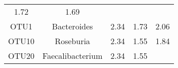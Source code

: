 \documentclass[12pt,]{article}
\begin{document}
\begin{longtable}[]{@{}ccccc@{}}
\begin{minipage}[t]{0.25\columnwidth}
1.72\strut
\end{minipage} & \begin{minipage}[t]{0.19\columnwidth}\centering\strut
1.69\strut
\end{minipage}\tabularnewline
\begin{minipage}[t]{0.07\columnwidth}\centering\strut
OTU1\strut
\end{minipage} & \begin{minipage}[t]{0.18\columnwidth}\centering\strut
Bacteroides\strut
\end{minipage} & \begin{minipage}[t]{0.17\columnwidth}\centering\strut
2.34\strut
\end{minipage} & \begin{minipage}[t]{0.25\columnwidth}\centering\strut
1.73\strut
\end{minipage} & \begin{minipage}[t]{0.19\columnwidth}\centering\strut
2.06\strut
\end{minipage}\tabularnewline
\begin{minipage}[t]{0.07\columnwidth}\centering\strut
OTU10\strut
\end{minipage} & \begin{minipage}[t]{0.18\columnwidth}\centering\strut
Roseburia\strut
\end{minipage} & \begin{minipage}[t]{0.17\columnwidth}\centering\strut
2.34\strut
\end{minipage} & \begin{minipage}[t]{0.25\columnwidth}\centering\strut
1.55\strut
\end{minipage} & \begin{minipage}[t]{0.19\columnwidth}\centering\strut
1.84\strut
\end{minipage}\tabularnewline
\begin{minipage}[t]{0.07\columnwidth}\centering\strut
OTU20\strut
\end{minipage} & \begin{minipage}[t]{0.18\columnwidth}\centering\strut
Faecalibacterium\strut
\end{minipage} & \begin{minipage}[t]{0.17\columnwidth}\centering\strut
2.34\strut
\end{minipage} & \begin{minipage}[t]{0.25\columnwidth}\centering\strut
1.55\strut
\end{minipage} & \begin{minipage}[t]{0.19\columnwidth}\centering\strut

\end{minipage}
\end{longtable}
\end{document}
